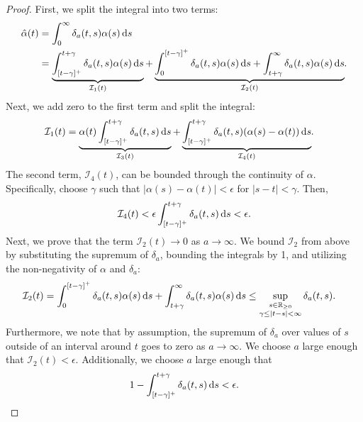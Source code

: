 \begin{proof}
	First, we split the integral into two terms:
	\begin{align}
		\hat \alpha(t)
		&= \int_0^\infty \delta_a(t, s) \alpha(s) \,\mathrm{d} s \\
		&= \underbrace{\int_{[t - \gamma]^+}^{t + \gamma} \delta_a(t, s) \alpha(s) \,\mathrm{d} s}_{\mathcal I_1(t)} + \underbrace{\int_0^{[t - \gamma]^+} \delta_a(t, s) \alpha(s) \,\mathrm{d} s + \int_{t + \gamma}^\infty \delta_a(t, s) \alpha(s) \,\mathrm{d} s}_{\mathcal I_2(t)}\hspace{-2pt}.
	\end{align}
	Next, we add zero to the first term and split the integral:
	\begin{align}
		\mathcal I_1(t) &= \underbrace{\alpha(t) \int_{[t - \gamma]^+}^{t + \gamma} \delta_a(t, s) \,\mathrm{d} s}_{\mathcal I_3(t)} + \underbrace{\int_{[t - \gamma]^+}^{t + \gamma} \delta_a(t, s) (\alpha(s) - \alpha(t)) \,\mathrm{d} s}_{\mathcal I_4(t)}\hspace{-2pt}.
	\end{align}
	The second term,  $\mathcal I_4(t)$, can be bounded through the continuity of $\alpha$. Specifically, choose $\gamma$ such that $|\alpha(s) - \alpha(t)| < \epsilon$ for $|s - t| < \gamma$. Then,
	\begin{align}
		\mathcal I_4(t) < \epsilon \int_{[t - \gamma]^+}^{t + \gamma} \delta_a(t, s) \,\mathrm{d} s < \epsilon.
	\end{align}
	Next, we prove that the term $\mathcal I_2(t) \rightarrow 0$ as $a \rightarrow \infty$. We bound $\mathcal I_2$ from above by substituting the supremum of $\delta_a$, bounding the integrals by 1, and utilizing the non-negativity of $\alpha$ and $\delta_a$:
	\begin{align}
		\mathcal I_2(t) &= \int_0^{[t - \gamma]^+} \delta_a(t, s) \alpha(s) \,\mathrm{d} s + \int_{t + \gamma}^\infty \delta_a(t, s) \alpha(s) \,\mathrm{d} s \leq \sup_{\substack{s \in \mathbb{R}_{\geq 0} \\ \gamma \leq |t - s| < \infty}} \delta_a(t, s).
	\end{align}
	Furthermore, we note that by assumption, the supremum of $\delta_a$ over values of $s$ outside of an interval around $t$ goes to zero as $a \rightarrow \infty$.
	We choose $a$ large enough that $\mathcal I_2(t) < \epsilon$. Additionally, we choose $a$ large enough that
	\begin{align}
		1 - \int_{[t - \gamma]^+}^{t + \gamma} \delta_a(t, s) \,\mathrm{d} s < \epsilon.
	\end{align}

\end{proof}
